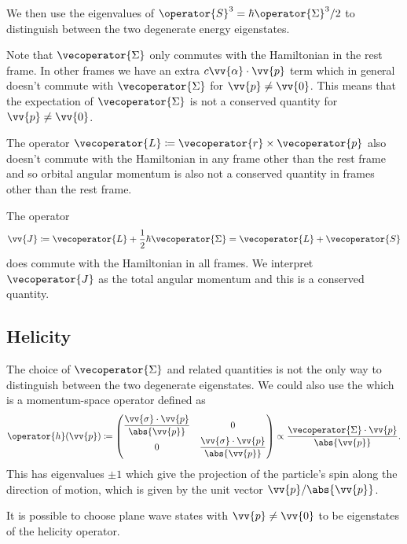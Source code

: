 \documentclass[fleqn]{NotesClass}
\begin{document}
    We then use the eigenvalues of \(\operator{S}^3 = \hbar\operator{\Sigma}^3/2\) to distinguish between the two degenerate energy eigenstates.
    
    Note that \(\vecoperator{\Sigma}\) only commutes with the Hamiltonian in the rest frame.
    In other frames we have an extra \(c\vv{\alpha} \cdot \vv{p}\) term which in general doesn't commute with \(\vecoperator{\Sigma}\) for \(\vv{p} \ne \vv{0}\).
    This means that the expectation of \(\vecoperator{\Sigma}\) is not a conserved quantity for \(\vv{p} \ne \vv{0}\).
    
    The operator \(\vecoperator{L} \coloneqq \vecoperator{r}\times\vecoperator{p}\) also doesn't commute with the Hamiltonian in any frame other than the rest frame and so orbital angular momentum is also not a conserved quantity in frames other than the rest frame.
    
    The operator
    \begin{equation}
        \vv{J} \coloneqq \vecoperator{L} + \frac{1}{2}\hbar\vecoperator{\Sigma} = \vecoperator{L} + \vecoperator{S}
    \end{equation}
    does commute with the Hamiltonian in all frames.
    We interpret \(\vecoperator{J}\) as the total angular momentum and this is a conserved quantity.
    
    \subsection{Helicity}
    The choice of \(\vecoperator{\Sigma}\) and related quantities is not the only way to distinguish between the two degenerate eigenstates.
    We could also use the  which is a momentum-space operator defined as
    \begin{equation}
        \operator{h}(\vv{p}) \coloneqq
        \begin{pmatrix}
            \dfrac{\vv{\sigma}\cdot\vv{p}}{\abs{\vv{p}}} & 0\\
            0 & \dfrac{\vv{\sigma}\cdot\vv{p}}{\abs{\vv{p}}}
        \end{pmatrix}
        \propto \frac{\vecoperator{\Sigma} \cdot \vv{p}}{\abs{\vv{p}}}.
    \end{equation}
    This has eigenvalues \(\pm 1\) which give the projection of the particle's spin along the direction of motion, which is given by the unit vector \(\vv{p}/\abs{\vv{p}}\).
    
    It is possible to choose plane wave states with \(\vv{p} \ne \vv{0}\) to be eigenstates of the helicity operator.
    
\end{document}
